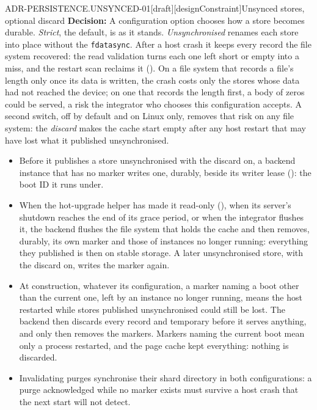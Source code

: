 \begin{requirement}{ADR-PERSISTENCE.UNSYNCED-01}[draft][designConstraint]{Unsynced stores, optional discard}
  \textbf{Decision:} A configuration option chooses how a store becomes
  durable. \emph{Strict}, the default, is 
  as it stands. \emph{Unsynchronised} renames each store into place without
  the \texttt{fdatasync}. After a host crash it keeps every record the file
  system recovered: the read validation turns each one left short or empty
  into a miss, and the restart scan reclaims it
  (). On a file system that records a file's
  length only once its data is written, the crash costs only the stores whose
  data had not reached the device; on one that records the length first, a
  body of zeros could be served, a risk the integrator who chooses this
  configuration accepts. A second switch, off by default and on Linux only,
  removes that risk on any file system: the \emph{discard} makes the cache
  start empty after any host restart that may have lost what it published
  unsynchronised.
  \begin{itemize}
    \item Before it publishes a store unsynchronised with the discard on, a
      backend instance that has no marker writes one, durably, beside its
      writer lease (): the boot ID it runs
      under.
    \item When the hot-upgrade helper has made it read-only
      (), when its server's shutdown reaches
      the end of its grace period, or when the integrator flushes it, the
      backend flushes the file system that holds
      the cache and then removes, durably, its own marker and those of
      instances no longer running: everything they published is then on
      stable storage. A later unsynchronised store, with the discard on,
      writes the marker again.
    \item At construction, whatever its configuration, a marker naming a boot
      other than the current one, left by an instance no longer running, means the host restarted while stores
      published unsynchronised could still be lost. The backend then discards
      every record and temporary before it serves anything, and only then
      removes the markers. Markers naming the current boot mean only a
      process restarted, and the page cache kept everything: nothing is
      discarded.
    \item Invalidating purges synchronise their shard directory in both
      configurations: a purge acknowledged while no marker exists must
      survive a host crash that the next start will not detect.
  \end{itemize}


\end{requirement}
